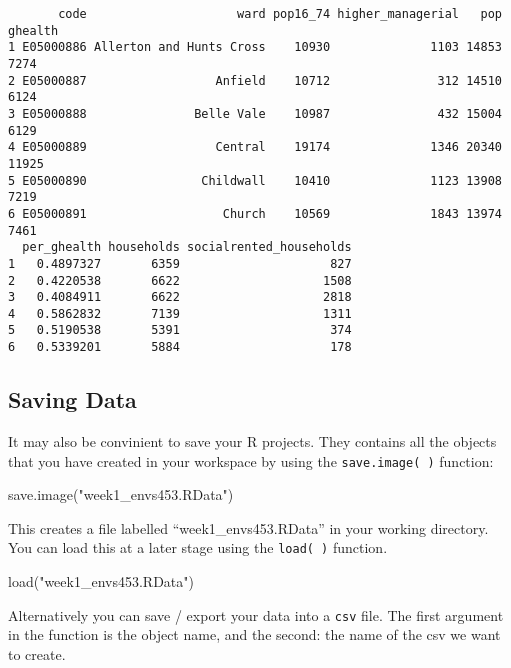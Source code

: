 \documentclass[
  letterpaper,
  krantz2]{style/krantz}
\newenvironment{Shaded}{\begin{snugshade}}{\end{snugshade}}
\newcommand{\FunctionTok}[1]{\textcolor[rgb]{0.28,0.35,0.67}{#1}}
\newcommand{\NormalTok}[1]{\textcolor[rgb]{0.00,0.23,0.31}{#1}}
\newcommand{\StringTok}[1]{\textcolor[rgb]{0.13,0.47,0.30}{#1}}
\begin{document}
\begin{verbatim}
       code                     ward pop16_74 higher_managerial   pop ghealth
1 E05000886 Allerton and Hunts Cross    10930              1103 14853    7274
2 E05000887                  Anfield    10712               312 14510    6124
3 E05000888               Belle Vale    10987               432 15004    6129
4 E05000889                  Central    19174              1346 20340   11925
5 E05000890                Childwall    10410              1123 13908    7219
6 E05000891                   Church    10569              1843 13974    7461
  per_ghealth households socialrented_households
1   0.4897327       6359                     827
2   0.4220538       6622                    1508
3   0.4084911       6622                    2818
4   0.5862832       7139                    1311
5   0.5190538       5391                     374
6   0.5339201       5884                     178
\end{verbatim}

\hypertarget{saving-data}{%
\subsection{Saving Data}\label{saving-data}}

It may also be convinient to save your R projects. They contains all the
objects that you have created in your workspace by using the
\texttt{save.image(\ )} function:

\begin{Shaded}
\begin{Highlighting}[]
\FunctionTok{save.image}\NormalTok{(}\StringTok{"week1\_envs453.RData"}\NormalTok{)}
\end{Highlighting}
\end{Shaded}

This creates a file labelled ``week1\_envs453.RData'' in your working
directory. You can load this at a later stage using the
\texttt{load(\ )} function.

\begin{Shaded}
\begin{Highlighting}[]
\FunctionTok{load}\NormalTok{(}\StringTok{"week1\_envs453.RData"}\NormalTok{)}
\end{Highlighting}
\end{Shaded}

Alternatively you can save / export your data into a \texttt{csv} file.
The first argument in the function is the object name, and the second:
the name of the csv we want to create.
\end{document}
